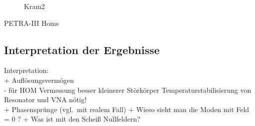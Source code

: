 \begin{figure}[h]
	\centering
	
	\caption{Kram2}
	\label{fig:ex_tm021_mode}
\end{figure}	

\begin{table}[htb]
	\centering
	
	\caption{PETRA-III Homs}
\end{table}

\subsection{Interpretation der Ergebnisse}

Interpretation:\\
+ Auflösungsvermögen\\
- für HOM Vermessung besser kleinerer Störkörper \textrightarrow Temperaturstabilisierung von Resonator und VNA nötig!\\

+ Phasensprünge (vgl.\ mit realem Fall)
+ Wieso sieht man die Moden mit Feld = 0 ?
+ Was ist mit den Scheiß Nullfeldern?





